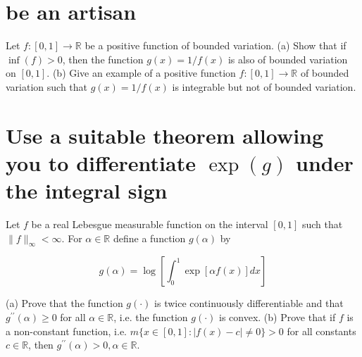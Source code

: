 \documentclass[lang=cn,11pt]{elegantbook}
\begin{document}
\section{be an artisan}
Let $f:[0,1] \rightarrow \mathbb{R}$ be a positive function of bounded variation.
(a) Show that if $\inf (f)>0$, then the function $g(x)=1 / f(x)$ is also of bounded variation on $[0,1]$.
(b) Give an example of a positive function $f:[0,1] \rightarrow \mathbb{R}$ of bounded variation such that $g(x)=1 / f(x)$ is integrable but not of bounded variation.\newline
\newline
\newline
\newline
\newline
\newline
\newline
\newline
\newline




\section{Use a suitable theorem allowing you to differentiate $\exp (g)$ under the integral sign}
Let $f$ be a real Lebesgue measurable function on the interval $[0,1]$ such that $\|f\|_{\infty}<\infty$. For $\alpha \in \mathbb{R}$ define a function $g(\alpha)$ by

$$
g(\alpha)=\log \left[\int_0^1 \exp [\alpha f(x)] d x\right]
$$\newline
\newline
\newline
\newline
\newline
\newline
\newline
\newline
\newline

(a) Prove that the function $g(\cdot)$ is twice continuously differentiable and that $g^{\prime \prime}(\alpha) \geq 0$ for all $\alpha \in \mathbb{R}$, i.e. the function $g(\cdot)$ is convex.
(b) Prove that if $f$ is a non-constant function, i.e. $m\{x \in[0,1]:|f(x)-c| \neq 0\}>0$ for all constants $c \in \mathbb{R}$, then $g^{\prime \prime}(\alpha)>0, \alpha \in \mathbb{R}$.\newline
\newline
\newline
\newline
\newline
\newline
\newline
\newline
\newline
\end{document}
